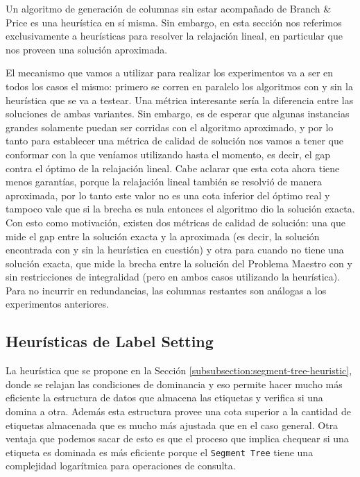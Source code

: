 Un algoritmo de generación de columnas sin estar acompañado de Branch \& Price es una heurística en sí misma. Sin embargo, en esta sección nos referimos exclusivamente a heurísticas para resolver la relajación lineal, en particular que nos proveen una solución aproximada. 

El mecanismo que vamos a utilizar para realizar los experimentos va a ser en todos los casos el mismo: primero se corren en paralelo los algoritmos con y sin la heurística que se va a testear. Una métrica interesante sería la diferencia entre las soluciones de ambas variantes. Sin embargo, es de esperar que algunas instancias grandes solamente puedan ser corridas con el algoritmo aproximado, y por lo tanto para establecer una métrica de calidad de solución nos vamos a tener que conformar con la que veníamos utilizando hasta el momento, es decir, el gap contra el óptimo de la relajación lineal. Cabe aclarar que esta cota ahora tiene menos garantías, porque la relajación lineal también se resolvió de manera aproximada, por lo tanto este valor no es una cota inferior del óptimo real y tampoco vale que si la brecha es nula entonces el algoritmo dio la solución exacta. Con esto como motivación, existen dos métricas de calidad de solución: una que mide el gap entre la solución exacta y la aproximada (es decir, la solución encontrada con y sin la heurística en cuestión) y otra para cuando no tiene una solución exacta, que mide la brecha entre la solución del Problema Maestro con y sin restricciones de integralidad (pero en ambos casos utilizando la heurística). Para no incurrir en redundancias, las columnas restantes son análogas a los experimentos anteriores.

\subsection{Heurísticas de Label Setting}
\label{section:experiments-label-setting-heur}

La heurística que se propone en la Sección \ref{subsubsection:segment-tree-heuristic}, donde se relajan las condiciones de dominancia y eso permite hacer mucho más eficiente la estructura de datos que almacena las etiquetas y verifica si una domina a otra. Además esta estructura provee una cota superior a la cantidad de etiquetas almacenada que es mucho más ajustada que en el caso general. Otra ventaja que podemos sacar de esto es que el proceso que implica chequear si una etiqueta es dominada es más eficiente porque el \texttt{Segment Tree} tiene una complejidad logarítmica para operaciones de consulta. 

